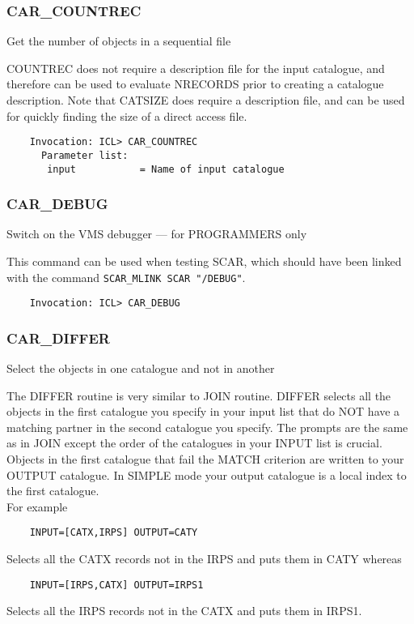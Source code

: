 \subsubsection{CAR\_COUNTREC}

Get the number of objects in a sequential file

COUNTREC does not require a description file for the
input catalogue, and therefore can be used to evaluate
NRECORDS prior to creating a catalogue description.
Note that CATSIZE does require a description file, and can be
used for quickly finding the size of a direct access file.

\begin{verbatim}
    Invocation: ICL> CAR_COUNTREC
      Parameter list:
       input           = Name of input catalogue
\end{verbatim}

\subsubsection{CAR\_DEBUG}

Switch on the VMS debugger --- for PROGRAMMERS only

This command can be used when testing SCAR, which should have been linked
with the command {\tt SCAR\_MLINK SCAR "/DEBUG"}.
\begin{verbatim}
    Invocation: ICL> CAR_DEBUG
\end{verbatim}

\subsubsection{CAR\_DIFFER}

Select the objects in one catalogue and not in another

The DIFFER routine is very similar to JOIN routine.
DIFFER selects all the objects in the first catalogue you specify in
your input list that do NOT have a matching partner in the second
catalogue you specify.
The prompts are the same as in JOIN except the order of the
catalogues in your INPUT list is crucial.
Objects in the first catalogue that fail the MATCH criterion are
written to your OUTPUT catalogue.
In SIMPLE mode your output catalogue is a local index to the first
catalogue.\\
For example
\begin{verbatim}
    INPUT=[CATX,IRPS] OUTPUT=CATY
\end{verbatim}
Selects all the CATX records not in the IRPS and puts them in CATY
whereas
\begin{verbatim}
    INPUT=[IRPS,CATX] OUTPUT=IRPS1
\end{verbatim}
Selects all the IRPS records not in the CATX and puts them in IRPS1.

